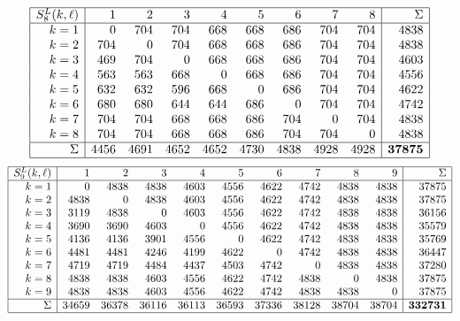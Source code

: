 \documentclass[11pt]{amsart}
\theoremstyle{definition}
\begin{document}
\[ \begin{array}{|r|rrrrrrrr|r|}
\hline
S^L_{8}(k, \ell)
& 1 & 2 & 3 & 4 & 5 & 6 & 7 & 8 & \Sigma \\ \hline
k= 1 & 0 & 704 & 704 & 668 & 668 & 686 & 704 & 704 & 4838 \\
k= 2 & 704 & 0 & 704 & 668 & 668 & 686 & 704 & 704 & 4838 \\
k= 3 & 469 & 704 & 0 & 668 & 668 & 686 & 704 & 704 & 4603 \\
k= 4 & 563 & 563 & 668 & 0 & 668 & 686 & 704 & 704 & 4556 \\
k= 5 & 632 & 632 & 596 & 668 & 0 & 686 & 704 & 704 & 4622 \\
k= 6 & 680 & 680 & 644 & 644 & 686 & 0 & 704 & 704 & 4742 \\
k= 7 & 704 & 704 & 668 & 668 & 686 & 704 & 0 & 704 & 4838 \\
k= 8 & 704 & 704 & 668 & 668 & 686 & 704 & 704 & 0 & 4838 \\
\hline
\Sigma & 4456 & 4691 & 4652 & 4652 & 4730 & 4838 & 4928 & 4928 & \mathbf{37875}
\\ \hline
\end{array}
\]
{\scriptsize
\[ \begin{array}{|r|rrrrrrrrr|r|}
\hline
S^L_{9}(k, \ell)
& 1 & 2 & 3 & 4 & 5 & 6 & 7 & 8 & 9 & \Sigma \\ \hline
k= 1 & 0 & 4838 & 4838 & 4603 & 4556 & 4622 & 4742 & 4838 & 4838 & 37875 \\
k= 2 & 4838 & 0 & 4838 & 4603 & 4556 & 4622 & 4742 & 4838 & 4838 & 37875 \\
k= 3 & 3119 & 4838 & 0 & 4603 & 4556 & 4622 & 4742 & 4838 & 4838 & 36156 \\
k= 4 & 3690 & 3690 & 4603 & 0 & 4556 & 4622 & 4742 & 4838 & 4838 & 35579 \\
k= 5 & 4136 & 4136 & 3901 & 4556 & 0 & 4622 & 4742 & 4838 & 4838 & 35769 \\
k= 6 & 4481 & 4481 & 4246 & 4199 & 4622 & 0 & 4742 & 4838 & 4838 & 36447 \\
k= 7 & 4719 & 4719 & 4484 & 4437 & 4503 & 4742 & 0 & 4838 & 4838 & 37280 \\
k= 8 & 4838 & 4838 & 4603 & 4556 & 4622 & 4742 & 4838 & 0 & 4838 & 37875 \\
k= 9 & 4838 & 4838 & 4603 & 4556 & 4622 & 4742 & 4838 & 4838 & 0 & 37875 \\
\hline
\Sigma & 34659 & 36378 & 36116 & 36113 & 36593 & 37336 & 38128 & 38704 & 38704 & \mathbf{332731}
\\ \hline
\end{array}
\]}
\end{document}
